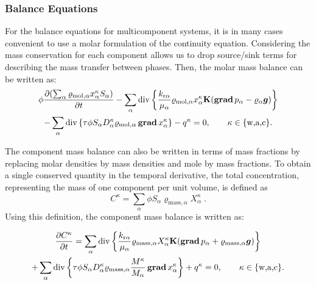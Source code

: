 \subsubsection{Balance Equations}
For the balance equations for multicomponent systems, it is in many
cases convenient to use a molar formulation of the continuity
equation. Considering the mass conservation for each component allows
us to drop source/sink terms for describing the mass transfer between
phases. Then, the
molar mass balance can be written as:
%
\begin{multline}
  \label{A3:eqmass1}
 \phi \frac{\partial (\sum_\alpha \varrho_{\text{mol}, \alpha}
    x_\alpha^\kappa S_\alpha )}{\partial t}
 - \sum\limits_\alpha \operatorname{div} \left\lbrace \frac{k_{\text{r}
        \alpha}}{\mu_\alpha} \varrho_{\text{mol}, \alpha}
    x_\alpha^\kappa \textbf{K} (\operatorname{\bf grad} p_\alpha -
    \varrho_{\alpha} \boldsymbol{g}) \right\rbrace  \\
 - \sum\limits_\alpha \operatorname{div} \left\lbrace \tau \phi S_\alpha D_\alpha^\kappa \varrho_{\text{mol},
      \alpha} \operatorname{\bf grad} x_\alpha^\kappa \right\rbrace
 - q^\kappa = 0, \qquad \kappa \in \{\text{w,a,c}\}.
\end{multline}

The component mass balance can also be written in terms of mass fractions
by replacing molar densities by mass densities and mole by mass fractions.
To obtain a single conserved quantity in the temporal derivative, the total
concentration, representing the mass of one component per unit volume, is defined as
\begin{displaymath}
C^\kappa = \sum_\alpha \phi S_\alpha \varrho_{\text{mass},\alpha} X_\alpha^\kappa \; .
\end{displaymath}
Using this definition, the component mass balance is written as:

\begin{multline}
  \label{A3:eqmass2}
    \frac{\partial C^\kappa}{\partial t} =
  \sum\limits_\alpha \operatorname{div} \left\lbrace \frac{k_{\text{r}
        \alpha}}{\mu_\alpha} \varrho_{\text{mass}, \alpha}
    X_\alpha^\kappa \textbf{K} (\operatorname{\bf grad} p_\alpha +
    \varrho_{\text{mass}, \alpha} \boldsymbol{g}) \right\rbrace  \\
   + \sum\limits_\alpha \operatorname{div} \left\lbrace \tau \phi S_\alpha D_\alpha^\kappa \varrho_{\text{mass},
      \alpha} \frac{M^\kappa}{M_\alpha} \operatorname{\bf grad} x_\alpha^\kappa \right\rbrace
 + q^\kappa = 0, \qquad \kappa \in \{\text{w,a,c}\}.
\end{multline}


